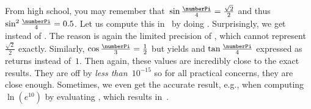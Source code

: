 From high school, you may remember that~$\sin{\frac{\numberPi}{4}}=\frac{\sqrt{2}}{2}$ and thus~$\sin^2{\frac{\numberPi}{4}}=0.5$.
Let us compute this in \python\ by doing .
Surprisingly, we get  instead of .
The reason is again the limited precision of , which cannot represent~$\frac{\sqrt{2}}{2}$ exactly.
Similarly, $\cos{\frac{\numberPi}{3}}=\frac{1}{2}$ but  yields  and $\tan{\frac{\numberPi}{4}}$ expressed as  returns  instead of~$1$.
Then again, these values are incredibly close to the exact results.
They are off by \emph{less than~$10^{-15}$} so for all practical concerns, they are close enough.
Sometimes, we even get the accurate result, e.g., when computing $\ln(e^{10})$ by evaluating , which results in~.

